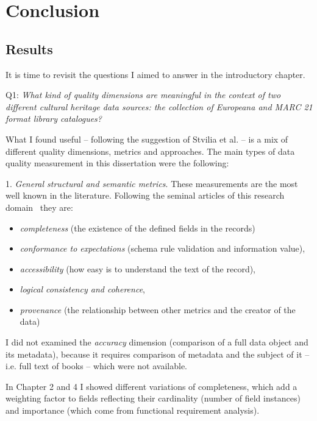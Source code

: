 \chapter{Conclusion}

\section{Results}

It is time to revisit the questions I aimed to answer in the introductory chapter.

Q1: \emph{What kind of quality dimensions are meaningful in the context of two different cultural heritage data sources: the collection of Europeana and MARC 21 format library catalogues?}

What I found useful -- following the suggestion of Stvilia et al. \cite{stvilia2007} -- is a mix of different quality dimensions, metrics and approaches. The main types of data quality measurement in this dissertation were the following:

1. \emph{General structural and semantic metrics}. These measurements are the most well known in the literature. Following the seminal articles of this research domain~\cite{bruce-hillmann2004, ochoa-duval2009} they are:

\begin{itemize}
  \item \emph{completeness} (the existence of the defined fields in the records)
  \item \emph{conformance to expectations} (schema rule validation and information value),
  \item \emph{accessibility} (how easy is to understand the text of the record),
  \item \emph{logical consistency and coherence},
  \item \emph{provenance} (the relationship between other metrics and the creator of the data)
\end{itemize}

I did not examined the \emph{accuracy} dimension (comparison of a full data object and its metadata), because it requires comparison of metadata and the subject of it -- i.e. full text of books -- which were not available.

In Chapter 2 and 4 I showed different variations of completeness, which add a weighting factor to fields reflecting their cardinality (number of field instances) and importance (which come from functional requirement analysis).

